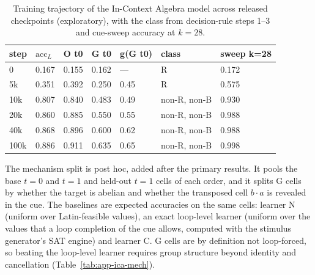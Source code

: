 \documentclass[11pt]{article}
\begin{document}
\begin{table}[tbp]
\centering
\small
\caption{Training trajectory of the In-Context Algebra model across released checkpoints (exploratory), with the class from decision-rule steps 1--3 and cue-sweep accuracy at $k = 28$.}\label{tab:app-ica-traj}
\begin{tabular}{@{}lllllll@{}}
\toprule
step & $\mathrm{acc}_L$ & O t0 & G t0 & g(G t0) & class & sweep k=28 \\
\midrule
0 & 0.167 & 0.155 & 0.162 & --- & R & 0.172 \\
5k & 0.351 & 0.392 & 0.250 & 0.45 & R & 0.575 \\
10k & 0.807 & 0.840 & 0.483 & 0.49 & non-R, non-B & 0.930 \\
20k & 0.860 & 0.885 & 0.550 & 0.55 & non-R, non-B & 0.988 \\
40k & 0.868 & 0.896 & 0.600 & 0.62 & non-R, non-B & 0.988 \\
100k & 0.886 & 0.911 & 0.635 & 0.65 & non-R, non-B & 0.998 \\
\bottomrule
\end{tabular}
\end{table}

The mechanism split is post hoc, added after the primary results. It pools the base $t = 0$ and $t = 1$ and held-out $t = 1$ cells of each order, and it splits G cells by whether the target is abelian and whether the transposed cell $b \cdot a$ is revealed in the cue. The baselines are expected accuracies on the same cells: learner N (uniform over Latin-feasible values), an exact loop-level learner (uniform over the values that a loop completion of the cue allows, computed with the stimulus generator's SAT engine) and learner C. G cells are by definition not loop-forced, so beating the loop-level learner requires group structure beyond identity and cancellation (Table~\ref{tab:app-ica-mech}).
\end{document}
